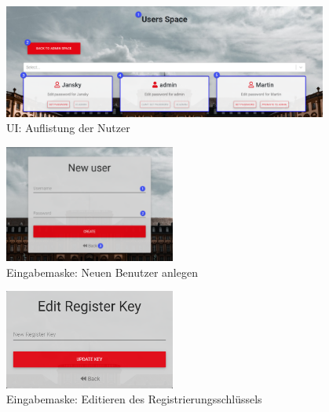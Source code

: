 \begin{figure}[H]
	\centering
	\includegraphics[width=0.95\textwidth, keepaspectratio]{img/guide/UserSpace.png}
	\captionsetup{justification=centering, format=plain}
	\caption[\acl{UI}: Auflistung der Nutzer]{\acl{UI}: Auflistung der Nutzer \\\quelleScreenshot}
	\label{fig:UserSpace}
\end{figure}

\begin{figure}[H]
	\centering
	\includegraphics[width=0.50\textwidth, keepaspectratio]{img/guide/NewUser.png}
	\captionsetup{justification=centering, format=plain}
	\caption[Eingabemaske: Neuen Benutzer anlegen]{Eingabemaske: Neuen Benutzer anlegen \\\quelleScreenshot}
	\label{fig:NeuenBenutzerAnlegen}
\end{figure}

\begin{figure}[H]
	\centering
	\includegraphics[width=0.5\textwidth, keepaspectratio]{img/guide/EditRegisterKey.png}
	\captionsetup{justification=centering, format=plain}
	\caption[Eingabemaske: Editieren des Registrierungsschlüssels]{Eingabemaske: Editieren des Registrierungsschlüssels \\\quelleScreenshot}
	\label{fig:EditRegisterKey}
\end{figure}



